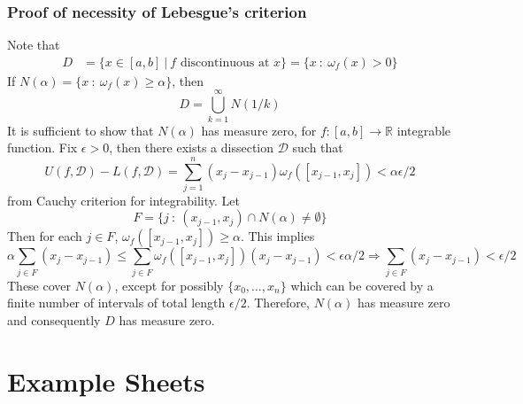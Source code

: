 \documentclass[10pt, a4paper, twoside]{report}
\begin{document}
\subsubsection{Proof of necessity of Lebesgue's criterion}
Note that 
\begin{align*}
    D&=\{x\in[a,b]\:|\:\text{\(f\) discontinuous at \(x\)}\}
    =\{x\::\:\omega_f(x)>0\}
\end{align*}
If \(N(\alpha)=\{x\::\:\omega_f(x)\geq\alpha\}\), then 
\[D=\bigcup_{k=1}^\infty N(1/k)\]
It is sufficient to show that \(N(\alpha)\) has measure zero, for \(f:[a,b]\to\mathbb{R}\) integrable function. Fix \(\epsilon>0\), then there exists a dissection \(\mathcal{D}\) such that 
\[U(f,\mathcal{D})-L(f,\mathcal{D})=\sum_{j=1}^{n}(x_j-x_{j-1})\omega_f([x_{j-1},x_j])<\alpha\epsilon/2\]
from Cauchy criterion for integrability. Let 
\[F=\{j\::\:(x_{j-1},x_j)\cap N(\alpha)\neq\emptyset\}\]
Then for each \(j\in F\), \(\omega_f([x_{j-1},x_j])\geq\alpha\). This implies 
\[\alpha\sum_{j\in F}(x_j-x_{j-1})\leq\sum_{j\in F}\omega_f([x_{j-1},x_j])(x_j-x_{j-1})<\epsilon\alpha/2\Rightarrow\sum_{j\in F}(x_j-x_{j-1})<\epsilon/2\]
These cover \(N(\alpha)\), except for possibly \(\{x_0,\ldots,x_n\}\) which can be covered by a finite number of intervals of total length \(\epsilon/2\). Therefore, \(N(\alpha)\) has measure zero and consequently \(D\) has measure zero.
\newpage
\section{Example Sheets}
\end{document}
